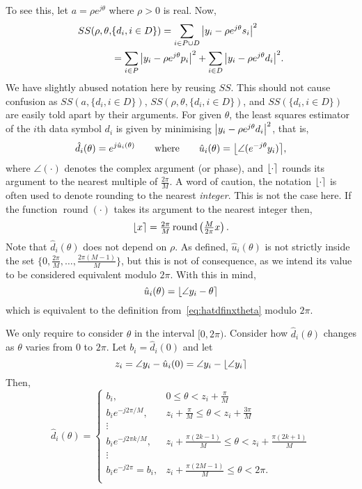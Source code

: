 \documentclass[draftcls, onecolumn, 11pt]{IEEEtran}
\begin{document}
To see this, let $a = \rho e^{j\theta}$ where $\rho > 0$ is real.  Now,
\begin{align}
SS(\rho, \theta, &\{d_i, i \in D\}) = \sum_{i \in P \cup D} {\left\vert  y_i - \rho e^{j\theta} s_i  \right\vert}^2  \nonumber \\
&= \sum_{i \in P} {\left\vert  y_i - \rho e^{j\theta} p_i  \right\vert}^2 + \sum_{i \in D} {\left\vert  y_i - \rho e^{j\theta} d_i  \right\vert}^2. \label{eq:SSallparams}
\end{align}
We have slightly abused notation here by reusing $SS$. This should not cause confusion as $SS(a, \{d_i, i \in D\})$, $SS(\rho, \theta, \{d_i, i \in D\})$, and $SS(\{d_i, i \in D\})$ are easily told apart by their arguments.  For given $\theta$, the least squares estimator of the $i$th data symbol $d_i$ is given by minimising ${\left\vert  y_i - \rho e^{j\theta} d_i  \right\vert}^2$, that is,
\begin{equation}\label{eq:hatdfinxtheta}
\hat{d}_i(\theta) = e^{j\hat{u}_i(\theta)} \qquad \text{where} \qquad \hat{u}_i(\theta) = {\left\lfloor \angle( e^{-j\theta}y_i) \right\rceil},
\end{equation}
where $\angle(\cdot)$ denotes the complex argument (or phase), and ${\left\lfloor \cdot \right\rceil}$ rounds its argument to the nearest multiple of $\frac{2\pi}{M}$.  A word of caution, the notation ${\left\lfloor \cdot \right\rceil}$ is often used to denote rounding to the nearest \emph{integer}.  This is not the case here.  If the function $\operatorname{round}(\cdot)$ takes its argument to the nearest integer then,
\[
{\left\lfloor x \right\rceil} = \tfrac{2\pi}{M}\operatorname{round}\left(\tfrac{M}{2\pi}x\right).
\] 
Note that $\hat{d}_i(\theta)$ does not depend on $\rho$.  As defined, $\hat{u}_i(\theta)$ is not strictly inside the set $\{0, \tfrac{2\pi}{M}, \dots, \tfrac{2\pi(M-1)}{M}\}$, but this is not of consequence, as we intend its value to be considered equivalent modulo $2\pi$.  With this in mind,
\[
\hat{u}_i(\theta) = {\left\lfloor \angle{y_i} - \theta  \right\rceil}
\]
which is equivalent to the definition from~\eqref{eq:hatdfinxtheta} modulo $2\pi$.

We only require to consider $\theta$ in the interval $[0, 2\pi)$.  Consider how $\hat{d}_i(\theta)$ changes as $\theta$ varies from $0$ to $2\pi$.  Let $b_i = \hat{d}_i(0)$ and let 
\[
z_i = \angle{y_i} - \hat{u}_i(0) = \angle{y_i} - {\left\lfloor \angle{y_i} \right\rceil}
\]
Then,
\begin{equation}\label{eq:uicombos}
\hat{d}_i(\theta) = 
\begin{cases}
b_i, &  0 \leq \theta < z_i + \frac{\pi}{M} \\
b_i e^{-j2\pi/M}, & z_i + \frac{\pi}{M} \leq \theta < z_i + \frac{3\pi}{M} \\ 
\vdots & \\
b_i e^{-j2\pi k /M}, & z_i + \frac{\pi(2k - 1)}{M} \leq \theta < z_i + \frac{\pi(2k + 1)}{M}  \\ 
\vdots & \\
b_i e^{-j2\pi} = b_i, &  z_i + \frac{\pi(2M - 1)}{M} \leq \theta < 2\pi. \\
\end{cases}
\end{equation}
\end{document}
